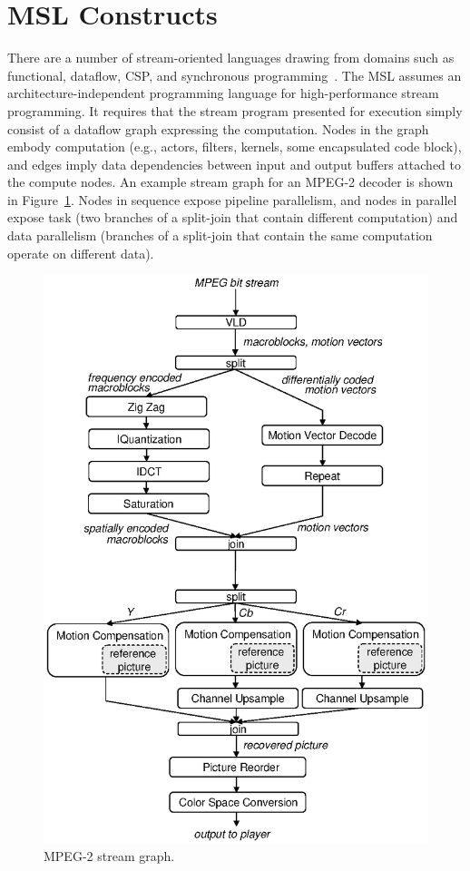 \section{MSL Constructs}

There are a number of stream-oriented languages drawing from
domains such as functional, dataflow, CSP, and synchronous
programming~\cite{survey97}. The MSL assumes an
architecture-independent programming language for high-performance
stream programming. It requires that the stream program presented for
execution simply consist of a dataflow graph expressing the
computation. Nodes in the graph embody computation (e.g., actors,
filters, kernels, some encapsulated code block), and edges imply data
dependencies between input and output buffers attached to the compute
nodes. An example stream graph for an MPEG-2 decoder is shown in
Figure~\ref{fig:mpeg}. Nodes in sequence expose pipeline parallelism,
and nodes in parallel expose task (two branches of a split-join that
contain different computation) and data parallelism (branches of a
split-join that contain the same computation operate on different data).

\begin{figure}[tb]
\begin{center}
\includegraphics[scale=.70]{figs/mpeg2d}
\end{center}
\caption[MPEG-2 stream graph.]{MPEG-2 stream graph.}
\label{fig:mpeg}
\end{figure}

